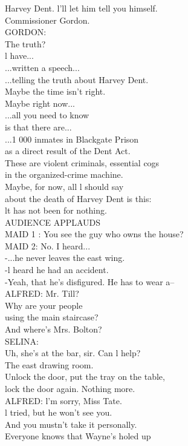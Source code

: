 \documentclass{article}
\begin{document}
\begin{multicols}{3}
Harvey Dent. l'll let him tell you himself.\\
Commissioner Gordon.\\
GORDON:\\
The truth?\\
l have...\\
...written a speech...\\
...telling the truth about Harvey Dent.\\
Maybe the time isn't right.\\
Maybe right now...\\
...all you need to know\\
is that there are...\\
...1 000 inmates in Blackgate Prison\\
as a direct result of the Dent Act.\\
These are violent criminals, essential cogs\\
in the organized-crime machine.\\
Maybe, for now, all l should say\\
about the death of Harvey Dent is this:\\
lt has not been for nothing.\\
AUDIENCE APPLAUDS\\
MAID 1 : You see the guy who owns the house?\\
MAID 2: No. I heard...\\
-...he never leaves the east wing.\\
-l heard he had an accident.\\
-Yeah, that he's disfigured. He has to wear a--\\
ALFRED: Mr. Till?\\
Why are your people\\
using the main staircase?\\
And where's Mrs. Bolton?\\
SELINA:\\
Uh, she's at the bar, sir. Can l help?\\
The east drawing room.\\
Unlock the door, put the tray on the table,\\
lock the door again. Nothing more.\\
ALFRED: l'm sorry, Miss Tate.\\
l tried, but he won't see you.\\
And you mustn't take it personally.\\
Everyone knows that Wayne's holed up\\

\end{multicols}
\end{document}
